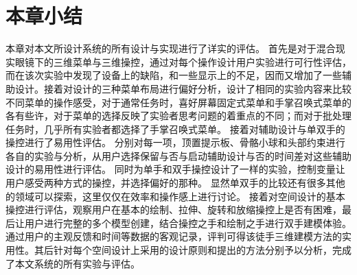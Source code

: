 \section{本章小结}
本章对本文所设计系统的所有设计与实现进行了详实的评估。
首先是对于混合现实眼镜下的三维菜单与三维操控，通过对每个操作设计用户实验进行可行性评估，而在该次实验中发现了设备上的缺陷，和一些显示上的不足，因而又增加了一些辅助设计。接着对设计的三种菜单布局进行偏好分析，设计了相同的实验内容来比较不同菜单的操作感受，对于通常任务时，喜好屏幕固定式菜单和手掌召唤式菜单的各有些许，对于菜单的选择反映了实验者思考问题的着重点的不同；而对于批处理任务时，几乎所有实验者都选择了手掌召唤式菜单。
接着对辅助设计与单双手的操控进行了易用性评估。
分别对每一项，顶置提示板、骨骼小球和头部约束进行各自的实验与分析，从用户选择保留与否与启动辅助设计与否的时间差对这些辅助设计的易用性进行评估。
同时为单手和双手操控设计了一样的实验，控制变量让用户感受两种方式的操控，并选择偏好的那种。
显然单双手的比较还有很多其他的领域可以探索，这里仅仅在效率和操作感上进行讨论。
接着对空间设计的基本操控进行评估，观察用户在基本的绘制、拉伸、旋转和放缩操控上是否有困难，最后让用户进行完整的多个模型创建，结合操控之手和绘制之手进行双手建模体验。
通过用户的主观反馈和时间等数据的客观记录，评判可得该徒手三维建模方法的实用性。其后针对每个空间设计上采用的设计原则和提出的方法分别予以分析，完成了本文系统的所有实验与评估。